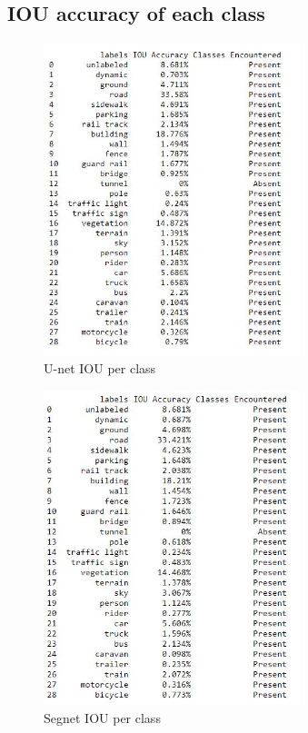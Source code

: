 \documentclass{IEEEtran}
\begin{document}
\newpage

\subsection{\textbf{IOU accuracy of each class}}
\begin{figure}[h]
    \centering
    \captionsetup{justification=centering}
    \includegraphics[width=7.5cm]{U-net-cityscrapes-B16-IOU-C29.JPG}
    \caption{U-net IOU per class}
    \label{fig:Binary class segmented output}
\end{figure}

\begin{figure}[h]
    \centering
    \captionsetup{justification=centering}
    \includegraphics[width=7.5cm]{Segnet-cityscrapes-B16-IOU-C29.JPG}
    \caption{Segnet IOU per class}
    \label{fig:Binary class segmented output}
\end{figure}
\end{document}

